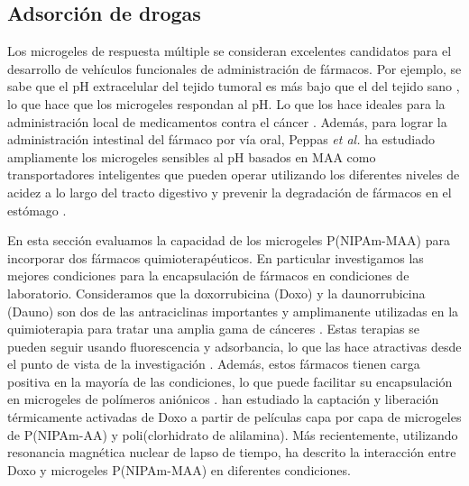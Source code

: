\subsection{Adsorci\'on de drogas}

Los microgeles de respuesta m\'ultiple se consideran excelentes candidatos para el desarrollo de veh\'iculos funcionales de administraci\'on de f\'armacos.
Por ejemplo, se sabe que el pH extracelular del tejido tumoral es m\'as bajo que el del tejido sano \cite{Gerweck1996}, lo que hace que los microgeles respondan al pH.
Lo que los hace ideales para la administraci\'on local de medicamentos contra el c\'ancer  \cite{Dadsetan2013}.
Adem\'as, para lograr la administraci\'on intestinal del f\'armaco por v\'ia oral,
Peppas \emph{et al.} ha estudiado ampliamente los microgeles sensibles al pH basados en MAA como transportadores inteligentes que pueden operar utilizando los diferentes niveles de acidez a lo largo del tracto digestivo y prevenir la degradaci\'on de f\'armacos en el est\'omago \cite{TorresLugo2002, Carr2010, DuranLobato2014, Sharpe2018}.


En esta secci\'on  evaluamos la capacidad de los microgeles P(NIPAm-MAA) para incorporar dos f\'armacos quimioterap\'euticos.
En particular investigamos las mejores condiciones para la encapsulaci\'on de f\'armacos en condiciones de laboratorio.
Consideramos que la doxorrubicina (Doxo) y la daunorrubicina (Dauno) son dos de las antraciclinas importantes y  amplimanente utilizadas en la quimioterapia para tratar una amplia gama de c\'anceres \cite{Panis2012, Carvalho2009, aubel1984daunorubicin,come1999dual}.
Estas terapias se pueden seguir usando fluorescencia y adsorbancia, lo que las hace atractivas desde el punto de vista de la investigaci\'on \cite{Serpe2005, ThanHtun2009, PerezChavez2020}.
Adem\'as, estos f\'armacos tienen carga positiva en la mayor\'ia de las condiciones, lo que puede facilitar su encapsulaci\'on en microgeles de pol\'imeros ani\'onicos \cite{Li2019}.
\citet{Serpe2005} han estudiado la captaci\'on y liberaci\'on t\'ermicamente activadas de Doxo a partir de pel\'iculas capa por capa de microgeles de P(NIPAm-AA) y poli(clorhidrato de alilamina).
M\'as recientemente, utilizando resonancia magn\'etica nuclear de lapso de tiempo, \citet{MartinezMoro2020} ha descrito la interacci\'on entre Doxo y microgeles P(NIPAm-MAA) en diferentes condiciones.



